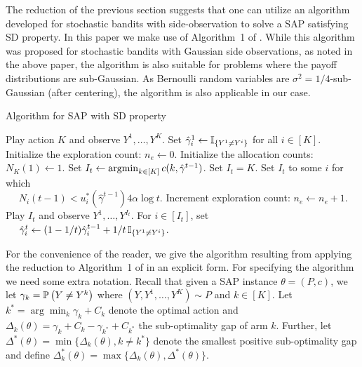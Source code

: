 \newcommand{\set}{\leftarrow}
\newcommand{\hgamma}{\hat{\gamma}}
The reduction of the previous section suggests that one can  utilize 
an algorithm developed for stochastic bandits with side-observation to solve a SAP satisfying SD property.
In this paper we make use of Algorithm~1 of \cite{WGySz:NIPS15}. 
While this algorithm was proposed for stochastic bandits with Gaussian side observations, 
as noted in the above paper, the algorithm is also suitable for problems where the payoff distributions are sub-Gaussian.
As Bernoulli random variables are $\sigma^2=1/4$-sub-Gaussian (after centering),
the algorithm is also applicable in our case.


	\begin{minipage}{0.48\textwidth}
		\begin{algorithm}[H]
			\caption{Algorithm for SAP with SD property} 
			\label{alg:asym}
			\begin{algorithmic}[1]
				\STATE Play action $K$ and observe  $Y^1,\dots,Y^K$.
				\STATE Set $\hgamma_{i}^1 \set \one{Y^1\ne Y^i}$ for all $i\in [K]$.
				\STATE Initialize the exploration count: $n_e \set 0$.
				\STATE Initialize the allocation counts: $N_K(1) \set 1$.
				\IF{$\frac{N(t-1)}{4\alpha \log t}\in C(\hgamma^{t-1})$} \label{alg:check}
				\STATE Set $I_t \set \argmin_{k\in [K]} c(k,\hgamma^{t-1})$. \label{alg:greedy}
				\ELSE
				 \label{alg:starve}
				\STATE Set $I_t =K$. \label{alg:forced}
				\ELSE
				\STATE Set $I_t$ to some $i$ for which \label{alg:plan} \\
				$\quad$ $N_i(t-1)< u_i^*(\hgamma^{t-1})4\alpha\log t$.
				\ENDIF
				\STATE Increment exploration count: $n_e \set n_e+1$.
				\ENDIF
				\STATE Play $I_t$ and observe  $Y^1,\dots,Y^{I_t}$.
				\STATE For $i\in [I_t]$, set\\
				$\quad$ $\hgamma_i^t \set (1-1/t) \hgamma_i^{t-1} + 1/t \,\one{Y^1\ne Y^i}$.
				\ENDFOR
			\end{algorithmic}
		\end{algorithm}
	\end{minipage}


For the convenience of the reader, we give the algorithm resulting from applying the reduction to Algorithm~1 
of \cite{WGySz:NIPS15} in an explicit form.
For specifying the algorithm we need some extra notation.
Recall that given a SAP instance $\theta = (P,c)$, we let $\gamma_k = \mathbb{P}\left(Y\ne Y^k\right)$ where $(Y,Y^1,\dots,Y^K)\sim P$ and $k\in [K]$. Let $k^*=\arg\min_k \gamma_k +C_k$ denote the optimal action and $\Delta_k(\theta)=\gamma_k+C_k-\gamma_{k^*}+C_{k^*}$ the sub-optimality gap of arm $k$. Further, let $\Delta^*(\theta) = \min\{\Delta_k(\theta), k\neq k^* \}$ denote the smallest positive sub-optimality gap and define $\Delta_k^*(\theta) =\max\{\Delta_k(\theta), \Delta^*(\theta)\}$.

